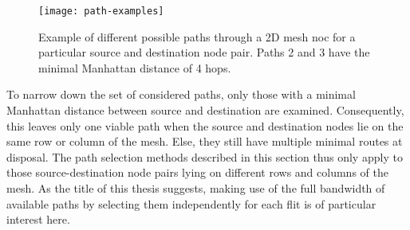 \begin{figure}
    \centering
    \texttt{[image: path-examples]}
    \caption[Examples of different paths between two nodes]{Example of different possible paths through a 2D mesh \gls{noc} for a particular source
    and destination node pair. Paths 2 and 3 have the minimal Manhattan distance of 4 hops.}
    \label{fig:pathexamples}
\end{figure}

To narrow down the set of considered paths, only those with a minimal Manhattan distance between source and destination are examined. Consequently, this
leaves only one viable path when the source and destination nodes lie on the same row or column of the mesh. Else, they still have multiple minimal
routes at disposal. The path selection methods described in this section thus only apply to those source-destination node pairs lying on different
rows and columns of the mesh. As the title of this thesis suggests, making use of the full bandwidth of available paths by selecting them
independently for each flit is of particular interest here.

